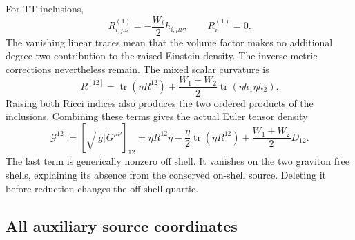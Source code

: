 \documentclass[11pt]{article}
\newcommand{\tr}{\operatorname{tr}}
\newcommand{\Gden}{\mathcal G}
\begin{document}
For TT inclusions,
\begin{equation}
 R^{(1)}_{i,\mu\nu}=-\frac{W_i}{2}h_{i,\mu\nu},\qquad R^{(1)}_i=0.
 \label{eq:Rlinear}
\end{equation}
The vanishing linear traces mean that the volume factor makes no additional degree-two contribution to the raised Einstein density.
The inverse-metric corrections nevertheless remain.
The mixed scalar curvature is
\begin{equation}
 R^{[12]}=\tr(\eta R^{12})
 +\frac{W_1+W_2}{2}\tr(\eta h_1\eta h_2).
 \label{eq:Rscalar12}
\end{equation}
Raising both Ricci indices also produces the two ordered products of the inclusions.
Combining these terms gives the actual Euler tensor density
\begin{equation}
 \boxed{\Gden^{12}:=[\sqrt{|g|}G^{\mu\nu}]_{12}
 =\eta R^{12}\eta-\frac{\eta}{2}\tr(\eta R^{12})
 +\frac{W_1+W_2}{2}D_{12}.}
 \label{eq:density-source}
\end{equation}
The last term is generically nonzero off shell.
It vanishes on the two graviton free shells, explaining its absence from the conserved on-shell source.
Deleting it before reduction changes the off-shell quartic.

\subsection{All auxiliary source coordinates}
\end{document}
